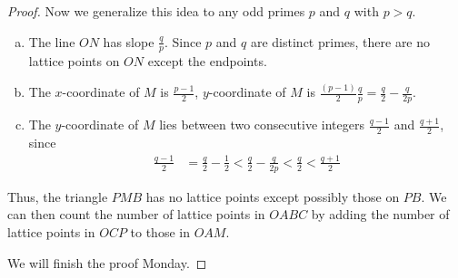 \documentclass[letterpaper, 11 pt]{article}
\begin{document}
\begin{proof}
%
%
%
%

Now we generalize this idea to any odd primes $p$ and $q$ with $p>q$.
\begin{enumerate}[(a)]
 \item The line $ON$ has slope $\frac{q}{p} $. Since $p$ and $q$ are distinct primes, there are no lattice points on $ON$ except the endpoints. 
  \item The $x$-coordinate of $M$ is $\frac{p-1}{2} $, $y$-coordinate of $M$ is $\frac{(p-1)}{2}\frac{q}{p}=\frac{q}{2}-\frac{q}{2p}$.
 \item The $y$-coordinate of $M$ lies between two consecutive integers $\frac{q-1}{2}$ and $\frac{q+1}{2}$, since 
\begin{align*}
 \frac{q-1}{2}&=\frac{q}{2}-\frac{1}{2}<\frac{q}{2}-\frac{q}{2p}<\frac{q}{2}<\frac{q+1}{2}
\end{align*}
\end{enumerate}

Thus, the triangle $PMB$ has no lattice points except possibly those on $PB$. We can then count the number of lattice points in $OABC$ by adding the number of lattice points in $OCP$ to those in $OAM$.


We will finish the proof Monday. \phantom\qedhere
\end{proof}
\end{document}
